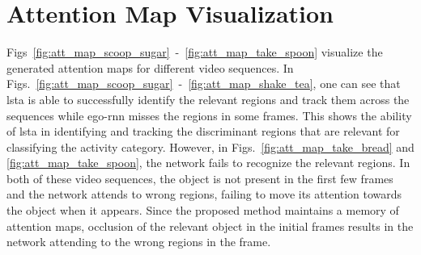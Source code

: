 \documentclass[10pt,twocolumn,letterpaper]{article}
\begin{document}
	


	
\section{Attention Map Visualization}

Figs~\ref{fig:att_map_scoop_sugar}~-~\ref{fig:att_map_take_spoon} visualize the generated attention maps for different video sequences. In Figs.~\ref{fig:att_map_scoop_sugar}~-~\ref{fig:att_map_shake_tea}, one can see that \acs{lsta} is able to successfully identify the relevant regions and track them across the sequences while ego-rnn misses the regions in some frames. This shows the ability of \acs{lsta} in identifying and tracking the discriminant regions that are relevant for classifying the activity category. However, in Figs.~\ref{fig:att_map_take_bread} and \ref{fig:att_map_take_spoon}, the network fails to recognize the relevant regions. In both of these video sequences, the object is not present in the first few frames and the network attends to wrong regions, failing to move its attention towards the object when it appears. Since the proposed method maintains a memory of attention maps, occlusion of the relevant object in the initial frames results in the network attending to the wrong regions in the frame.
	
\end{document}
